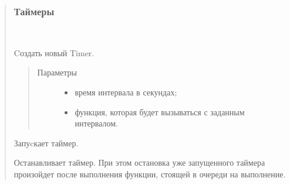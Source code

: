 \documentclass[a4paper,10pt,russian]{sphinxmanual}
\begin{document}
\begin{quote}
\subsubsection{Таймеры}
\label{\detokenize{programming/lua/lua:id2}}

\begin{fulllineitems}
\label{\detokenize{programming/lua/lua:Timer}}~

\begin{fulllineitems}
\label{\detokenize{programming/lua/lua:Timer.new}}
Cоздать новый Timer.
\begin{quote}\begin{description}
\item[{Параметры}] \leavevmode\begin{itemize}
\item {} 
 \textendash{} время интервала в секундах;

\item {} 
 \textendash{} функция, которая будет вызываться с заданным интервалом.

\end{itemize}

\end{description}\end{quote}

\end{fulllineitems}


\begin{fulllineitems}
\label{\detokenize{programming/lua/lua:Timer.start}}
Запуcкает таймер.

\end{fulllineitems}


\begin{fulllineitems}
\label{\detokenize{programming/lua/lua:Timer.stop}}
Останавливает таймер. При этом остановка уже запущенного таймера произойдет после выполнения функции, стоящей в очереди на выполнение.


\end{fulllineitems}
\end{fulllineitems}
\end{quote}
\end{document}

